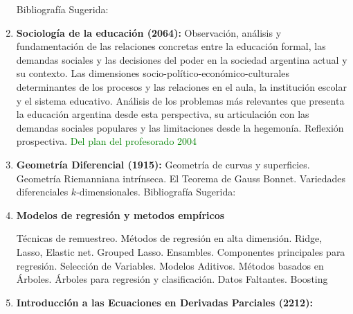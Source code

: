 \documentclass[a4paper, 12pt]{article}
\begin{document}
\begin{enumerate}
Bibliografía Sugerida: \cite{ GeorgeFinlaySimmons487,WilliamE.Boyce496, MorrisW.Hirsch540,JorgeSotomayor513,BarbaraD.MacCluer515,RichardS.Palais519,GarrettBirkhoff526}



\item\textbf{Sociología de la educación (2064):}  Observación, análisis y fundamentación de las relaciones concretas entre la educación formal, las demandas sociales y las decisiones del poder en la sociedad argentina actual y su contexto. Las dimensiones socio-político-económico-culturales determinantes de los procesos y las relaciones en el aula, la institución escolar y el sistema educativo. Análisis de los problemas más relevantes que presenta la educación argentina desde esta perspectiva, su articulación con las demandas sociales populares y las limitaciones desde la hegemonía. Reflexión prospectiva. \textcolor{green}{Del plan del profesorado 2004}







\item\textbf{Geometría Diferencial (1915):} Geometría de curvas y superficies.
 Geometría Riemanniana
intrínseca. El Teorema de Gauss Bonnet. Variedades diferenciales $k$-dimensionales.
Bibliografía Sugerida: \cite{docarmo,morgan,oneill}


\item\textbf{Modelos de regresión y metodos empíricos}

 Técnicas de remuestreo. Métodos de regresión en alta dimensión. Ridge, Lasso, Elastic net. Grouped Lasso. Ensambles. Componentes principales para regresión. Selección de Variables. Modelos Aditivos. Métodos basados en Árboles. Árboles para regresión y clasificación. Datos Faltantes. Boosting


\item\textbf{Introducción a las Ecuaciones en Derivadas Parciales (2212):}  



\end{enumerate}
\end{document}
